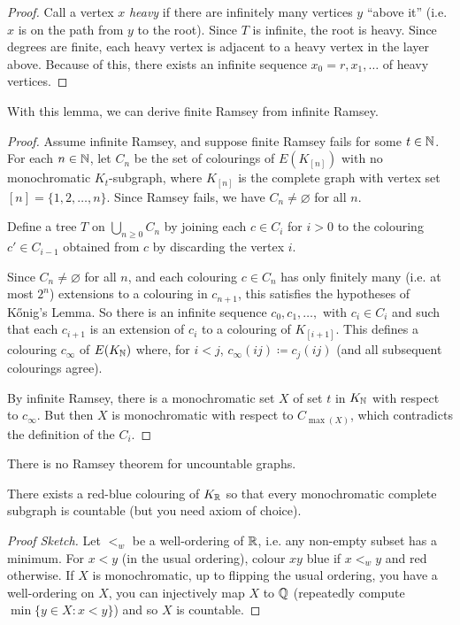 \documentclass[main.tex]{subfiles}
\begin{document}
\begin{proof}%
  Call a vertex $x$ \textit{heavy} if there are infinitely many vertices $y$
  ``above it'' (i.e. $x$ is on the path from $y$ to the root).
  Since $T$ is infinite, the root is heavy.
  Since degrees are finite, each heavy vertex is adjacent to a heavy vertex in
  the layer above.
  Because of this, there exists an infinite sequence $x_0 = r, x_1, \ldots$ of heavy vertices.
\end{proof}
With this lemma, we can derive finite Ramsey from infinite Ramsey.
\begin{proof}
  Assume infinite Ramsey, and suppose finite Ramsey fails for some $t\in\mathbb N$.
  For each $n\in\mathbb N$, let $C_n$ be the set of colourings of $E(K_{[n]})$ with
  no monochromatic $K_t$-subgraph, where $K_{[n]}$ is the complete graph with
  vertex set $[n]=\{1,2,\ldots,n\}$.
  Since Ramsey fails, we have $C_n\neq\varnothing$ for all $n$.

  Define a tree $T$ on $\bigcup_{n\geq 0} C_n$ by joining each $c\in C_i$ for
  $i > 0$ to the colouring $c'\in C_{i-1}$ obtained from $c$ by discarding the
  vertex $i$.

  Since $C_n\neq\varnothing$ for all $n$, and each colouring $c\in C_n$ has
  only finitely many (i.e. at most $2^n$) extensions to a colouring in $c_{n+1}$,
  this satisfies the hypotheses of K\H{o}nig's Lemma.
  So there is an infinite sequence $c_0,c_1,\ldots,$ with $c_i\in C_i$ and such
  that each $c_{i+1}$ is an extension of $c_i$ to a colouring of $K_{[i+1]}$.
  This defines a colouring $c_\infty$ of $E(K_{\mathbb N})$ where, for $i < j$,
  $c_\infty(ij)\coloneqq c_j(ij)$ (and all subsequent colourings agree).

  By infinite Ramsey, there is a monochromatic set $X$ of set $t$ in $K_\mathbb N$
  with respect to $c_\infty$.
  But then $X$ is monochromatic with respect to $C_{\max(X)}$, which contradicts
  the definition of the $C_i$.
\end{proof}
There is no Ramsey theorem for uncountable graphs.
\begin{theorem}[Sierpinski]
  There exists a red-blue colouring of $K_\mathbb R$ so that every monochromatic
  complete subgraph is countable (but you need axiom of choice).
\end{theorem}
\begin{proof}[Proof Sketch]
  Let $<_w$ be a well-ordering of $\mathbb R$, i.e. any non-empty subset has a minimum.
  For $x < y$ (in the usual ordering), colour $xy$ blue if $x <_w y$ and red
  otherwise.
  If $X$ is monochromatic, up to flipping the usual ordering, you have a
  well-ordering on $X$, you can injectively map $X$ to $\mathbb Q$
  (repeatedly compute $\min\{y\in X : x < y\}$) and so $X$ is countable.
\end{proof}
\end{document}
